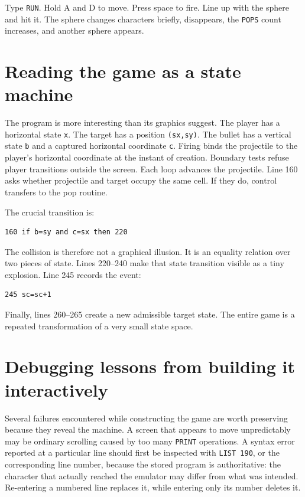 \documentclass[11pt]{article}
\begin{document}
Type \texttt{RUN}. Hold A and D to move. Press space to fire. Line up with the sphere and hit it. The sphere changes characters briefly, disappears, the \texttt{POPS} count increases, and another sphere appears.

\section{Reading the game as a state machine}

The program is more interesting than its graphics suggest. The player has a horizontal state \texttt{x}. The target has a position \texttt{(sx,sy)}. The bullet has a vertical state \texttt{b} and a captured horizontal coordinate \texttt{c}. Firing binds the projectile to the player's horizontal coordinate at the instant of creation. Boundary tests refuse player transitions outside the screen. Each loop advances the projectile. Line 160 asks whether projectile and target occupy the same cell. If they do, control transfers to the pop routine.

The crucial transition is:

\begin{lstlisting}[style=basic]
160 if b=sy and c=sx then 220
\end{lstlisting}

The collision is therefore not a graphical illusion. It is an equality relation over two pieces of state. Lines 220--240 make that state transition visible as a tiny explosion. Line 245 records the event:

\begin{lstlisting}[style=basic]
245 sc=sc+1
\end{lstlisting}

Finally, lines 260--265 create a new admissible target state. The entire game is a repeated transformation of a very small state space.

\section{Debugging lessons from building it interactively}

Several failures encountered while constructing the game are worth preserving because they reveal the machine. A screen that appears to move unpredictably may be ordinary scrolling caused by too many \texttt{PRINT} operations. A syntax error reported at a particular line should first be inspected with \texttt{LIST 190}, or the corresponding line number, because the stored program is authoritative: the character that actually reached the emulator may differ from what was intended. Re-entering a numbered line replaces it, while entering only its number deletes it.
\end{document}
